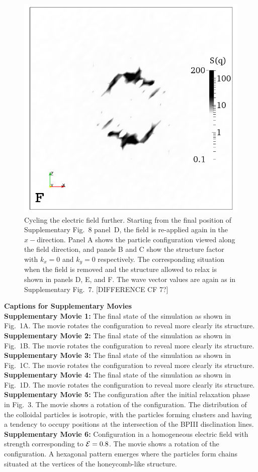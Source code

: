 \documentclass[12pt,twoside]{article}
\begin{document}
\begin{figure}[!h]
\begin{center}
\includegraphics[width=0.32\columnwidth]{sq_y_run1347.png}
\end{center}
\caption{Cycling the electric field further. Starting from the final
position of Supplementary Fig.~8 panel~D, the field is re-applied
again in the $x-$direction. Panel A shows the particle configuration
viewed along the field direction, and panels B and C show the structure
factor with $k_x = 0$ and $k_y = 0$ respectively. The corresponding
situation when the field is removed and the structure allowed to relax
is shown in panels D, E, and F. The wave vector values are again as
in Supplementary Fig.~7. [DIFFERENCE CF 7?]}
\end{figure}

\clearpage
 
{\bf Captions for Supplementary Movies} \\

{\bf Supplementary Movie 1:} 
The final state of the simulation as shown in Fig.~1A. The movie
rotates the configuration to reveal more clearly its structure.\\

{\bf Supplementary Movie 2:} 
The final state of the simulation as shown in Fig.~1B. The movie
rotates the configuration to reveal more clearly its structure.\\


{\bf Supplementary Movie 3:} 
The final state of the simulation as shown in Fig.~1C. The movie
rotates the configuration to reveal more clearly its structure.\\


{\bf Supplementary Movie 4:} 
The final state of the simulation as shown in Fig.~1D. The movie
rotates the configuration to reveal more clearly its structure.\\


{\bf Supplementary Movie 5:} 
The configuration after the initial relaxation phase in Fig.~3. The movie
shows a rotation of the configuration. The distribution of the colloidal
particles is isotropic, with the particles forming clusters and having a
tendency to occupy positions at the intersection of the BPIII disclination
lines.\\

{\bf Supplementary Movie 6:} 
Configuration in a homogeneous electric field with strength
corresponding to ${\cal E}=0.8$. The movie
shows a rotation of the configuration.
A hexagonal pattern emerges where the particles form chains
situated at the vertices of the honeycomb-like structure. \\
\end{document}
